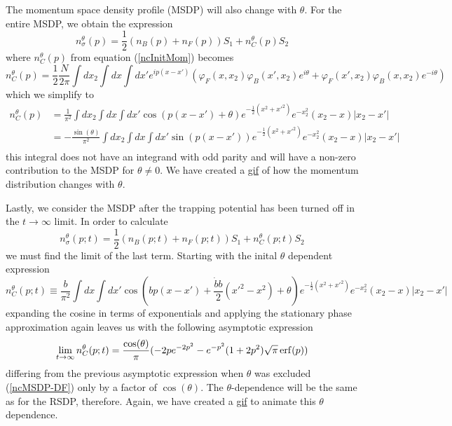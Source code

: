 \documentclass[onecolumn,english,aps,pra]{revtex4}
\begin{document}
The momentum space density profile (MSDP) will also change with $\theta$. For the entire MSDP, we obtain the expression 
\begin{equation}
n_\sigma^\theta(p) = \frac{1}{2}\left(n_B(p) + n_F(p)\right)
 S_1 + n_C^\theta(p)S_2
\end{equation}
where $n_C^\theta(p)$ from equation (\ref{ncInitMom}) becomes
\begin{equation}
n_C^\theta(p) = \frac{1}{2}\frac{N}{2\pi}\int dx_2  \int dx \int dx' e^{ip(x-x')}(\varphi_F(x,x_2)\varphi_B(x',x_2)e^{i\theta} + \varphi_F(x',x_2)\varphi_B(x,x_2)e^{-i\theta})
\label{ncInitMomTheta}
\end{equation}
which we simplify to
\begin{align*}
n_C^\theta(p) &= \frac{1}{\pi^2}\int dx_2  \int dx \int dx' \cos(p(x-x') + \theta) e^{-\frac{1}{2} (x^2 + x'^2)} e^{-x_2^2} (x_2 -x) |x_2 - x'|\\
&= -\frac{\sin(\theta)}{\pi^2}\int dx_2  \int dx \int dx' \sin(p(x-x')) e^{-\frac{1}{2} (x^2 + x'^2)} e^{-x_2^2} (x_2 -x) |x_2 - x'|\\
\end{align*}
this integral does not have an integrand with odd parity and will have a non-zero contribution to the MSDP for $\theta \neq 0$. We have created a \href{https://github.com/TimSkaras/UltraColdAtoms/blob/master/Plots/ThetaEvolutionMSDP.gif}{gif} of how the momentum distribution changes with $\theta$.

Lastly, we consider the MSDP after the trapping potential has been turned off in the $t \rightarrow \infty$ limit. In order to calculate 
\begin{equation}
n_\sigma^\theta(p;t) = \frac{1}{2}\left(n_B(p;t) + n_F(p;t)\right)
 S_1 + n_C^\theta(p;t)S_2
\end{equation}
we must find the limit of the last term. Starting with the inital $\theta$ dependent expression
\begin{equation}
n_C^\theta(p;t) \equiv \frac{b}{\pi^2} \int dx \int dx' \cos(bp(x-x') + \frac{\dot{b}b}{2}(x'^2 - x^2) + \theta)
e^{-\frac{1}{2}(x^2 + x'^2)}e^{-x_2^2}(x_2 -x) |x_2 -x'|
\end{equation}
expanding the cosine in terms of exponentials and applying the stationary phase approximation again leaves us with the following asymptotic expression
\begin{equation}
\lim_{t\rightarrow \infty} n_C^\theta(p;t) = \frac{\cos(\theta)}{\pi}(-2pe^{-2p^2}-e^{-p^2}(1+2p^2)\sqrt{\pi}\erf(p))
\end{equation}
differing from the previous asymptotic expression when $\theta$ was excluded (\ref{ncMSDP-DF}) only by a factor of $\cos(\theta)$. The $\theta$-dependence will be the same as for the RSDP, therefore. Again, we have created a \href{https://github.com/TimSkaras/UltraColdAtoms/blob/master/Plots/ThetaEvolutionMSDP-DF.gif}{gif} to animate this $\theta$ dependence.
\pagebreak


\end{document}
